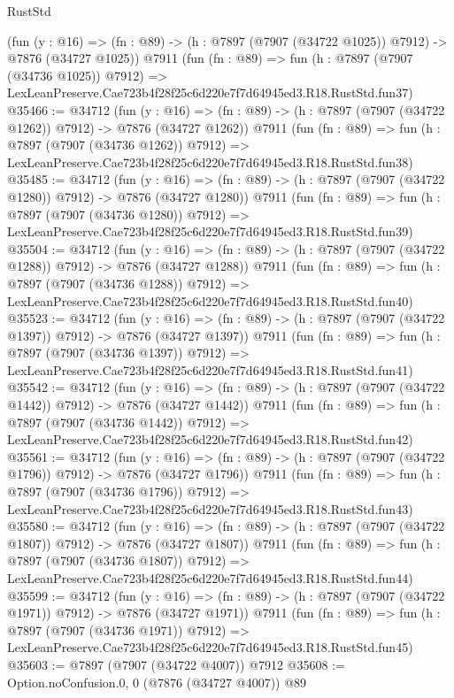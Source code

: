 \begin{lexlean}{RustStd}
\begin{coremodule}
    (fun (y : @16) =>
    (fn : @89) -> (h : @7897 (@7907 (@34722 @1025)) @7912) -> @7876 (@34727 @1025))
    @7911
    (fun (fn : @89) =>
    fun (h : @7897 (@7907 (@34736 @1025)) @7912) =>
    LexLeanPreserve.Cae723b4f28f25c6d220e7f7d64945ed3.R18.RustStd.fun37)
@35466 := @34712
    (fun (y : @16) =>
    (fn : @89) -> (h : @7897 (@7907 (@34722 @1262)) @7912) -> @7876 (@34727 @1262))
    @7911
    (fun (fn : @89) =>
    fun (h : @7897 (@7907 (@34736 @1262)) @7912) =>
    LexLeanPreserve.Cae723b4f28f25c6d220e7f7d64945ed3.R18.RustStd.fun38)
@35485 := @34712
    (fun (y : @16) =>
    (fn : @89) -> (h : @7897 (@7907 (@34722 @1280)) @7912) -> @7876 (@34727 @1280))
    @7911
    (fun (fn : @89) =>
    fun (h : @7897 (@7907 (@34736 @1280)) @7912) =>
    LexLeanPreserve.Cae723b4f28f25c6d220e7f7d64945ed3.R18.RustStd.fun39)
@35504 := @34712
    (fun (y : @16) =>
    (fn : @89) -> (h : @7897 (@7907 (@34722 @1288)) @7912) -> @7876 (@34727 @1288))
    @7911
    (fun (fn : @89) =>
    fun (h : @7897 (@7907 (@34736 @1288)) @7912) =>
    LexLeanPreserve.Cae723b4f28f25c6d220e7f7d64945ed3.R18.RustStd.fun40)
@35523 := @34712
    (fun (y : @16) =>
    (fn : @89) -> (h : @7897 (@7907 (@34722 @1397)) @7912) -> @7876 (@34727 @1397))
    @7911
    (fun (fn : @89) =>
    fun (h : @7897 (@7907 (@34736 @1397)) @7912) =>
    LexLeanPreserve.Cae723b4f28f25c6d220e7f7d64945ed3.R18.RustStd.fun41)
@35542 := @34712
    (fun (y : @16) =>
    (fn : @89) -> (h : @7897 (@7907 (@34722 @1442)) @7912) -> @7876 (@34727 @1442))
    @7911
    (fun (fn : @89) =>
    fun (h : @7897 (@7907 (@34736 @1442)) @7912) =>
    LexLeanPreserve.Cae723b4f28f25c6d220e7f7d64945ed3.R18.RustStd.fun42)
@35561 := @34712
    (fun (y : @16) =>
    (fn : @89) -> (h : @7897 (@7907 (@34722 @1796)) @7912) -> @7876 (@34727 @1796))
    @7911
    (fun (fn : @89) =>
    fun (h : @7897 (@7907 (@34736 @1796)) @7912) =>
    LexLeanPreserve.Cae723b4f28f25c6d220e7f7d64945ed3.R18.RustStd.fun43)
@35580 := @34712
    (fun (y : @16) =>
    (fn : @89) -> (h : @7897 (@7907 (@34722 @1807)) @7912) -> @7876 (@34727 @1807))
    @7911
    (fun (fn : @89) =>
    fun (h : @7897 (@7907 (@34736 @1807)) @7912) =>
    LexLeanPreserve.Cae723b4f28f25c6d220e7f7d64945ed3.R18.RustStd.fun44)
@35599 := @34712
    (fun (y : @16) =>
    (fn : @89) -> (h : @7897 (@7907 (@34722 @1971)) @7912) -> @7876 (@34727 @1971))
    @7911
    (fun (fn : @89) =>
    fun (h : @7897 (@7907 (@34736 @1971)) @7912) =>
    LexLeanPreserve.Cae723b4f28f25c6d220e7f7d64945ed3.R18.RustStd.fun45)
@35603 := @7897 (@7907 (@34722 @4007)) @7912
@35608 := Option.noConfusion.{0, 0} (@7876 (@34727 @4007)) @89

\end{coremodule}
\end{lexlean}

